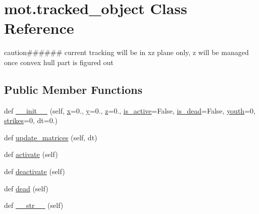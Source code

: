 \hypertarget{classmot_1_1tracked__object}{}\section{mot.\+tracked\+\_\+object Class Reference}
\label{classmot_1_1tracked__object}


caution\#\#\#\#\#\# current tracking will be in xz plane only, z will be managed once convex hull part is figured out  


\subsection*{Public Member Functions}
\begin{DoxyCompactItemize}
\item 
def \hyperlink{classmot_1_1tracked__object_a15a1a975124c8c8a87232063ea9c8f37}{\+\_\+\+\_\+init\+\_\+\+\_\+} (self, \hyperlink{classmot_1_1tracked__object_ac78ee1daddcff29c0edbef88e4370ffa}{x}=0., \hyperlink{classmot_1_1tracked__object_abd3e436fb18ba75bbdcef0142ffc5dee}{y}=0., \hyperlink{classmot_1_1tracked__object_a557c82a367e7932c8ee09d6173ef8a4c}{z}=0., \hyperlink{classmot_1_1tracked__object_a35a31c9e6f822eae9ff5ca5f72678687}{is\+\_\+active}=False, \hyperlink{classmot_1_1tracked__object_a67774c920ad68d87e2ec5c9c24c6fc41}{is\+\_\+dead}=False, \hyperlink{classmot_1_1tracked__object_a28e39b4317941f7dbd7d5c9b1586a414}{youth}=0, \hyperlink{classmot_1_1tracked__object_a83c8c4e2de30738f82b230237ae7ef78}{strikes}=0, dt=0.)
\item 
def \hyperlink{classmot_1_1tracked__object_acc90761003e14a1270e517f7b9b356da}{update\+\_\+matrices} (self, dt)
\item 
def \hyperlink{classmot_1_1tracked__object_ad5c025903cca465d22650a01e70dac44}{activate} (self)
\item 
def \hyperlink{classmot_1_1tracked__object_a4e36f1b91847d6d64890026eb7f51924}{deactivate} (self)
\item 
def \hyperlink{classmot_1_1tracked__object_a222ae20784de687532efc54632299b4a}{dead} (self)
\item 
def \hyperlink{classmot_1_1tracked__object_a85d7a4f4ea22ab10a426b344cc5fa827}{\+\_\+\+\_\+str\+\_\+\+\_\+} (self)
\end{DoxyCompactItemize}
